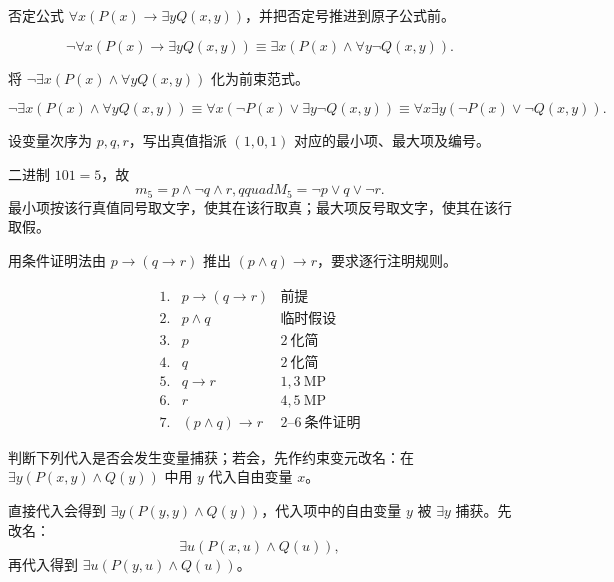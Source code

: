\begin{exercise}[level=standard]
否定公式 $\forall x(P(x)\to\exists yQ(x,y))$，并把否定号推进到原子公式前。
\begin{solution}
\[
\neg\forall x(P(x)\to\exists yQ(x,y))
\equiv\exists x(P(x)\land\forall y\neg Q(x,y)).
\]
\end{solution}
\end{exercise}

\begin{exercise}[level=standard]
将 $\neg\exists x(P(x)\land\forall yQ(x,y))$ 化为前束范式。
\begin{solution}
\[
\neg\exists x(P(x)\land\forall yQ(x,y))
\equiv\forall x(\neg P(x)\lor\exists y\neg Q(x,y))
\equiv\forall x\exists y(\neg P(x)\lor\neg Q(x,y)).
\]
\end{solution}
\end{exercise}

\begin{exercise}[level=standard]
设变量次序为 $p,q,r$，写出真值指派 $(1,0,1)$ 对应的最小项、最大项及编号。
\begin{solution}
二进制 $101=5$，故
\[
m_5=p\land\neg q\land r,qquad
M_5=\neg p\lor q\lor\neg r.
\]
最小项按该行真值同号取文字，使其在该行取真；最大项反号取文字，使其在该行取假。
\end{solution}
\end{exercise}

\begin{exercise}[level=standard]
用条件证明法由 $p\to(q\to r)$ 推出 $(p\land q)\to r$，要求逐行注明规则。
\begin{solution}
\[
\begin{array}{rll}
1.&p\to(q\to r)&\text{前提}\\
2.&p\land q&\text{临时假设}\\
3.&p&2\ \text{化简}\\
4.&q&2\ \text{化简}\\
5.&q\to r&1,3\ \text{MP}\\
6.&r&4,5\ \text{MP}\\
7.&(p\land q)\to r&2\text{--}6\ \text{条件证明}
\end{array}
\]
\end{solution}
\end{exercise}

\begin{exercise}[level=standard]
判断下列代入是否会发生变量捕获；若会，先作约束变元改名：在
$\exists y(P(x,y)\land Q(y))$ 中用 $y$ 代入自由变量 $x$。
\begin{solution}
直接代入会得到 $\exists y(P(y,y)\land Q(y))$，代入项中的自由变量
$y$ 被 $\exists y$ 捕获。先改名：
\[
\exists u(P(x,u)\land Q(u)),
\]
再代入得到 $\exists u(P(y,u)\land Q(u))$。
\end{solution}
\end{exercise}

